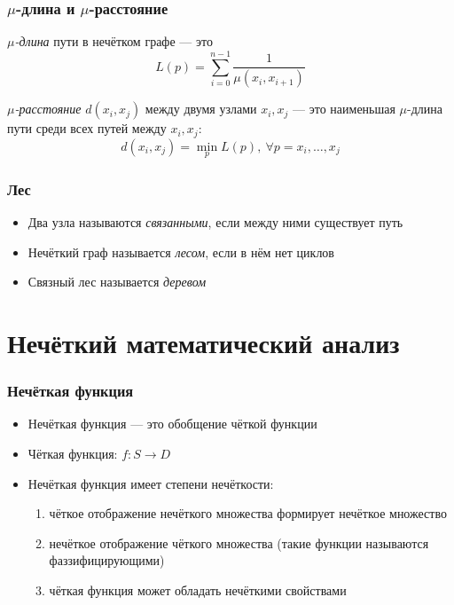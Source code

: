 \documentclass{beamer}
\begin{document}
\begin{frame}\frametitle{$\mu$-длина и $\mu$-расстояние}
    \begin{definition}
        \textit{$\mu$-длина} пути в нечётком графе --- это
        \[
            L(p) = \sum_{i=0}^{n-1}\frac{1}{\mu(x_i, x_{i+1})}
        \]
    \end{definition}
    
    \begin{definition}
        \textit{$\mu$-расстояние} $d(x_i, x_j)$ между двумя узлами $x_i, x_j$ --- это наименьшая $\mu$-длина пути среди всех путей между $x_i, x_j$:
        \[
            d(x_i, x_j) = \min_p L(p),\ \forall p = x_i, \dots, x_j
        \]
    \end{definition}
\end{frame}

\begin{frame}\frametitle{Лес}
    \begin{itemize}
        \item Два узла называются \textit{связанными}, если между ними существует путь
        \item Нечёткий граф называется \textit{лесом}, если в нём нет циклов
        \item Связный лес называется \textit{деревом}
    \end{itemize}

\end{frame}

\section{Нечёткий математический анализ}

\begin{frame}\frametitle{Нечёткая функция}
    \begin{itemize}
        \item Нечёткая функция --- это обобщение чёткой функции
        \item Чёткая функция: $f: S \to D$
        \item Нечёткая функция имеет степени нечёткости:
        \begin{enumerate}
            \item чёткое отображение нечёткого множества формирует нечёткое множество
            \item нечёткое отображение чёткого множества (такие функции называются фаззифицирующими)
            \item чёткая функция может обладать нечёткими свойствами
        \end{enumerate}
    \end{itemize}
\end{frame}
\end{document}
